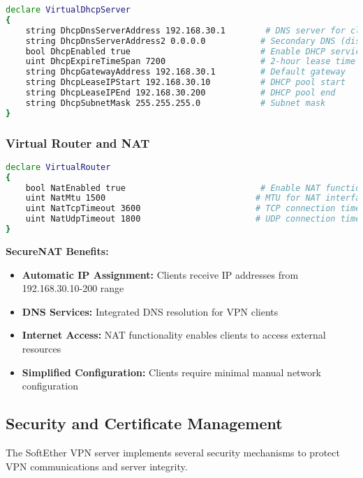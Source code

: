 \begin{lstlisting}[language=bash]
declare VirtualDhcpServer
{
    string DhcpDnsServerAddress 192.168.30.1        # DNS server for clients
    string DhcpDnsServerAddress2 0.0.0.0           # Secondary DNS (disabled)
    bool DhcpEnabled true                          # Enable DHCP service
    uint DhcpExpireTimeSpan 7200                   # 2-hour lease time
    string DhcpGatewayAddress 192.168.30.1         # Default gateway
    string DhcpLeaseIPStart 192.168.30.10          # DHCP pool start
    string DhcpLeaseIPEnd 192.168.30.200           # DHCP pool end
    string DhcpSubnetMask 255.255.255.0            # Subnet mask
}
\end{lstlisting}

\subsubsection{Virtual Router and NAT}

\begin{lstlisting}[language=bash]
declare VirtualRouter
{
    bool NatEnabled true                           # Enable NAT functionality
    uint NatMtu 1500                              # MTU for NAT interface
    uint NatTcpTimeout 3600                       # TCP connection timeout (1 hour)
    uint NatUdpTimeout 1800                       # UDP connection timeout (30 minutes)
}
\end{lstlisting}

\textbf{SecureNAT Benefits:}

\begin{itemize}
    \item \textbf{Automatic IP Assignment:} Clients receive IP addresses from 192.168.30.10-200 range
    \item \textbf{DNS Services:} Integrated DNS resolution for VPN clients
    \item \textbf{Internet Access:} NAT functionality enables clients to access external resources
    \item \textbf{Simplified Configuration:} Clients require minimal manual network configuration
\end{itemize}

\subsection{Security and Certificate Management}

The SoftEther VPN server implements several security mechanisms to protect VPN communications and server integrity.

